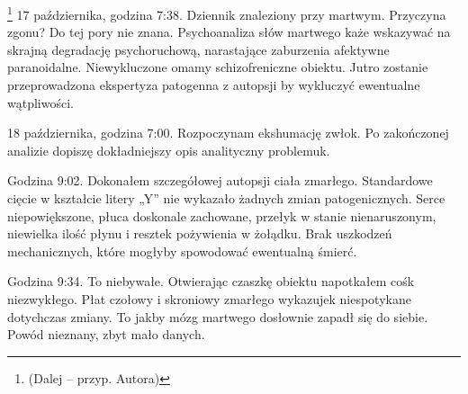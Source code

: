 \documentclass[../MAIN.tex]{subfiles}
\begin{document}







\footnote{(Dalej – przyp. Autora)} 17 października, godzina
7:38. Dziennik znaleziony przy martwym. Przyczyna zgonu? Do tej
pory nie znana. Psychoanaliza słów martwego każe wskazywać na
skrajną degradację psychoruchową, narastające zaburzenia
afektywne paranoidalne. Niewykluczone omamy schizofreniczne
obiektu. Jutro zostanie przeprowadzona ekspertyza patogenna z
autopsji by wykluczyć ewentualne wątpliwości.

18 października, godzina 7:00. Rozpoczynam ekshumację zwłok. Po
zakończonej analizie dopiszę dokładniejszy opis analityczny
problemu\3k.

Godzina 9:02. Dokonałem szczegółowej autopsji ciała zmarłego.
Standardowe cięcie w kształcie litery „Y” nie wykazało żadnych
zmian patogenicznych. Serce niepowiększone, płuca doskonale
zachowane, przełyk w stanie nienaruszonym, niewielka ilość
płynu i resztek pożywienia w żołądku. Brak uszkodzeń
mechanicznych, które mogłyby spowodować ewentualną śmierć.

Godzina 9:34. To niebywałe. Otwierając czaszkę obiektu
napotkałem coś\3k niezwykłego. Płat czołowy i skroniowy
zmarłego wykazuje\3k niespotykane dotychczas zmiany. To jakby
mózg martwego dosłownie zapadł się do siebie. Powód nieznany,
zbyt mało danych.
\end{document}
